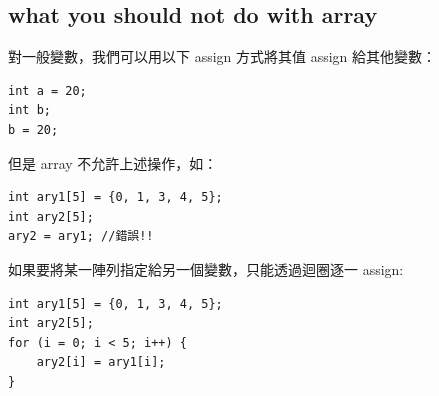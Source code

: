 \documentclass[a4paper,12pt]{article}
\begin{document}
\subsection{what you should not do with array}
\label{sec:org47b7a8b}
對一般變數，我們可以用以下 assign 方式將其值 assign 給其他變數：\\
\lstset{breaklines=true,language=cpp,label= ,caption= ,captionpos=b,firstnumber=1,numbers=left}
\begin{lstlisting}
int a = 20;
int b;
b = 20;
\end{lstlisting}

但是 array 不允許上述操作，如：\\
\lstset{breaklines=true,language=cpp,label= ,caption= ,captionpos=b,firstnumber=1,numbers=left}
\begin{lstlisting}
int ary1[5] = {0, 1, 3, 4, 5};
int ary2[5];
ary2 = ary1; //錯誤!!
\end{lstlisting}

如果要將某一陣列指定給另一個變數，只能透過迴圈逐一 assign:\\
\lstset{breaklines=true,language=cpp,label= ,caption= ,captionpos=b,firstnumber=1,numbers=left}
\begin{lstlisting}
int ary1[5] = {0, 1, 3, 4, 5};
int ary2[5];
for (i = 0; i < 5; i++) {
    ary2[i] = ary1[i];
}
\end{lstlisting}
\end{document}
